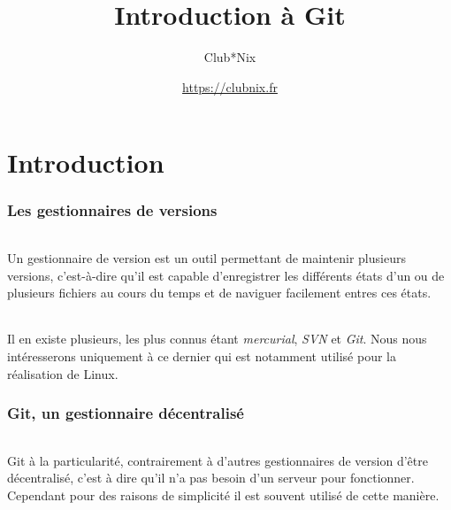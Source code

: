\documentclass[french, a4paper, 12pt, titlepage]{article}
\begin{document}
\title{Introduction à Git}
\author{Club*Nix}
\date{\url{https://clubnix.fr}}

\maketitle

\vfill
\pagebreak

\newpage
\strut\thispagestyle{empty}
\vfill
\pagebreak
\tableofcontents
\strut\thispagestyle{empty}
\newpage
\setcounter{page}{1}

\part{Introduction}

\section{Les gestionnaires de versions}

\paragraph{} Un gestionnaire de version est un outil permettant de maintenir plusieurs versions, c'est-à-dire qu'il est capable d'enregistrer les différents états d'un ou de plusieurs fichiers au cours du temps et de naviguer facilement entres ces états.

\paragraph{}Il en existe plusieurs, les plus connus étant \emph{mercurial}, \emph{SVN} et \emph{Git}.  Nous nous intéresserons uniquement à ce dernier qui est notamment utilisé pour la réalisation de Linux.

\section{Git, un gestionnaire décentralisé}

\paragraph{} Git à la particularité, contrairement à d'autres gestionnaires de version d'être décentralisé, c'est à dire qu'il n'a pas besoin d'un serveur pour fonctionner.  Cependant pour des raisons de simplicité il est souvent utilisé de cette manière.
\end{document}
